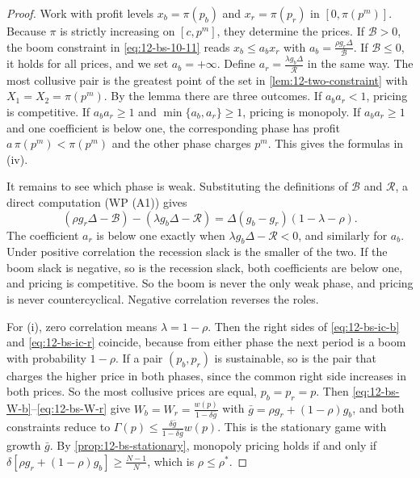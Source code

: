 \begin{proof}
Work with profit levels $x_b = \pi(p_b)$ and $x_r = \pi(p_r)$ in $[0, \pi(p^m)]$. Because $\pi$ is strictly increasing on
$[c, p^m]$, they determine the prices. If $\mathcal B > 0$, the boom constraint in \eqref{eq:12-bs-10-11} reads
$x_b \le a_b x_r$ with $a_b = \frac{\rho g_r\Delta}{\mathcal B}$. If $\mathcal B \le 0$, it holds for all prices, and we set
$a_b = +\infty$. Define $a_r = \frac{\lambda g_b\Delta}{\mathcal R}$ in the same way. The most collusive pair is the greatest
point of the set in \cref{lem:12-two-constraint} with $X_1 = X_2 = \pi(p^m)$. By the lemma there are three outcomes.
If $a_ba_r < 1$, pricing is competitive. If $a_ba_r \ge 1$ and $\min\{a_b, a_r\} \ge 1$, pricing is monopoly. If
$a_ba_r \ge 1$ and one coefficient is below one, the corresponding phase has profit $a\,\pi(p^m) < \pi(p^m)$ and the other
phase charges $p^m$. This gives the formulas in (iv).

It remains to see which phase is weak. Substituting the definitions of $\mathcal B$ and $\mathcal R$, a direct computation
(WP (A1)) gives
\begin{equation*}
\left(\rho g_r\Delta - \mathcal B\right) - \left(\lambda g_b\Delta - \mathcal R\right) = \Delta(g_b - g_r)(1 - \lambda - \rho).
\end{equation*}
The coefficient $a_r$ is below one exactly when $\lambda g_b\Delta - \mathcal R < 0$, and similarly for $a_b$. Under positive correlation the
recession slack is the smaller of the two. If the boom slack is negative, so is the recession slack, both coefficients
are below one, and pricing is competitive. So the boom is never the only weak phase, and pricing is never
countercyclical. Negative correlation reverses the roles.

For (i), zero correlation means $\lambda = 1 - \rho$. Then the right sides of \eqref{eq:12-bs-ic-b} and \eqref{eq:12-bs-ic-r}
coincide, because from either phase the next period is a boom with probability $1-\rho$. If a pair $(p_b, p_r)$ is
sustainable, so is the pair that charges the higher price in both phases, since the common right side increases in
both prices. So the most collusive prices are equal, $p_b = p_r = p$. Then \eqref{eq:12-bs-W-b}--\eqref{eq:12-bs-W-r} give
$W_b = W_r = \frac{w(p)}{1 - \delta\bar g}$ with $\bar g = \rho g_r + (1-\rho)g_b$, and both constraints reduce to
$\Gamma(p) \le \frac{\delta\bar g}{1 - \delta\bar g}w(p)$. This is the stationary game with growth $\bar g$. By
\cref{prop:12-bs-stationary}, monopoly pricing holds if and only if $\delta\left[\rho g_r + (1-\rho)g_b\right] \ge \frac{N-1}{N}$,
which is $\rho \le \rho^*$.


\end{proof}
